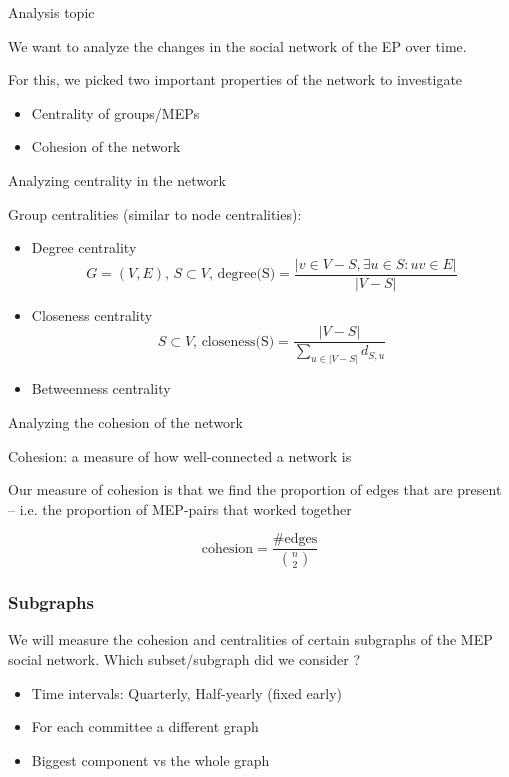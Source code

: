 \documentclass{beamer}
\begin{document}
\begin{frame}{Analysis topic}
	
	We want to analyze the changes in the social network of the EP over time.
	
	\vspace{2mm}
	
	\pause For this, we picked two important properties of the network to investigate\begin{itemize}
		\pause \item Centrality of groups/MEPs
		
		\pause \item Cohesion of the network
	\end{itemize}
	
\end{frame}

\begin{frame}{Analyzing centrality in the network}
	
	Group centralities (similar to node centralities):
\begin{itemize}
	\pause \item Degree centrality 
	\[ 
		G = (V,E)\text{, } S \subset V \text{,  }\text{degree(S)} = \frac{|v \in V-S, \exists u \in S: uv \in E|}{|V-S|}	
	\]
	
	\pause \item Closeness centrality 
	\[
		S \subset V \text{,  }\text{closeness(S)} = \frac{|V-S|}{\sum_{u \in |V-S|}d_{S,u} }
	\]
		
	\pause \item Betweenness centrality

\end{itemize}
\end{frame}

\begin{frame}{Analyzing the cohesion of the network}
	
	Cohesion: a measure of how well-connected a network is
	
	\vspace{2mm}
	
	\pause Our measure of cohesion is that we find the proportion of edges that are present -- i.e. the proportion of MEP-pairs that worked together
	
	\pause \[
		\text{cohesion} = \frac{\#\text{edges}}{\binom{n}{2}}
	\]
	
\end{frame}


\begin{frame}
\frametitle{Subgraphs}
	We will measure the cohesion and centralities of certain subgraphs of the MEP social network.
	Which subset/subgraph did we consider ? 
	\begin{itemize}
	\pause \item Time intervals: Quarterly, Half-yearly (fixed early)
	\pause \item For each committee a different graph
	\pause \item Biggest component vs the whole graph
	\end{itemize}
\end{frame}
\end{document}
